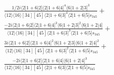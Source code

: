 \documentclass[varwidth, border=5pt]{standalone}
\begin{document}
\begin{my}
$\begin{gathered}
\scriptscriptstyle\frac{1/2i⟨2|1+6|2]⟨2|1+6|4]^4⟨6|1+2|3]^3}{⟨12⟩⟨16⟩[34][45]⟨2|1+6|3]^4⟨2|1+6|5]s_{345}}+\\
\scriptscriptstyle\frac{-2i⟨2|1+6|2]⟨2|1+6|4]^3⟨6|1+2|3]^2⟨6|1+2|4]}{⟨12⟩⟨16⟩[34][45]⟨2|1+6|3]^3⟨2|1+6|5]s_{345}}+\\
\scriptscriptstyle\frac{3i⟨2|1+6|2]⟨2|1+6|4]^2⟨6|1+2|3]⟨6|1+2|4]^2}{⟨12⟩⟨16⟩[34][45]⟨2|1+6|3]^2⟨2|1+6|5]s_{345}}+\\
\scriptscriptstyle\frac{-2i⟨2|1+6|2]⟨2|1+6|4]⟨6|1+2|4]^3}{⟨12⟩⟨16⟩[34][45]⟨2|1+6|3]⟨2|1+6|5]s_{345}}\phantom{+}
\end{gathered}$
\end{my}
\end{document}
